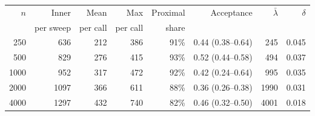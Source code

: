 \begin{tabular}{rrrrrrrr}
\toprule
$n$ & Inner & Mean & Max & Proximal & Acceptance & $\bar\lambda$ & $\delta$ \\
 & per sweep & per call & per call & share & & & \\
\midrule
250 & 636 & 212 & 386 & 91\% & 0.44 (0.38--0.64) & 245 & 0.045 \\
500 & 829 & 276 & 415 & 93\% & 0.52 (0.44--0.58) & 494 & 0.037 \\
1000 & 952 & 317 & 472 & 92\% & 0.42 (0.24--0.64) & 995 & 0.035 \\
2000 & 1097 & 366 & 611 & 88\% & 0.36 (0.26--0.38) & 1990 & 0.031 \\
4000 & 1297 & 432 & 740 & 82\% & 0.46 (0.32--0.50) & 4001 & 0.018 \\
\bottomrule
\end{tabular}
